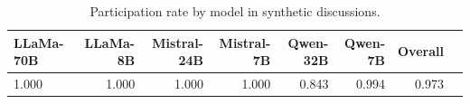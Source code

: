 \begin{table}[ht]
\caption{Participation rate by model in synthetic discussions.}
\label{tab:participation}
\begin{tabular}{lrrrrrrr}
\toprule
LLaMa-70B & LLaMa-8B & Mistral-24B & Mistral-7B & Qwen-32B & Qwen-7B & Overall \\
\midrule
1.000 & 1.000 & 1.000 & 1.000 & 0.843 & 0.994 & 0.973 \\
\bottomrule
\end{tabular}
\end{table}
